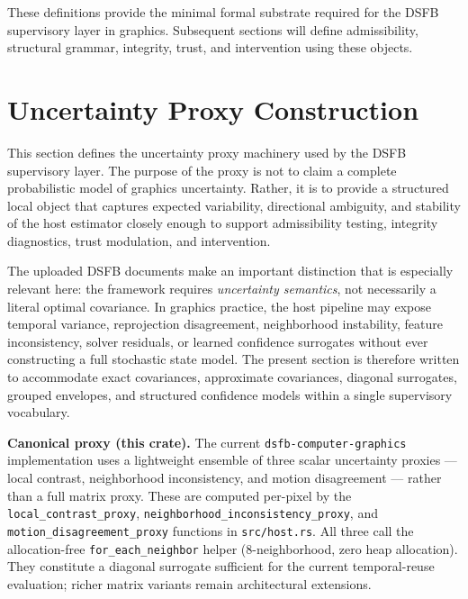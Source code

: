 \documentclass[11pt]{article}
\theoremstyle{definition}
\theoremstyle{plain}
\newenvironment{remarkbox}{%
  \begin{tcolorbox}[colback=blue!4,colframe=black!30,boxrule=0.4pt,%
    left=4pt,right=4pt,top=3pt,bottom=3pt,parbox=false]%
}{%
  \end{tcolorbox}%
}
\begin{document}
These definitions provide the minimal formal substrate required for the DSFB supervisory layer in graphics. Subsequent sections will define admissibility, structural grammar, integrity, trust, and intervention using these objects.


\section{Uncertainty Proxy Construction}
\label{sec:proxy}

This section defines the uncertainty proxy machinery used by the DSFB supervisory layer. The purpose of the proxy is not to claim a complete probabilistic model of graphics uncertainty. Rather, it is to provide a structured local object that captures expected variability, directional ambiguity, and stability of the host estimator closely enough to support admissibility testing, integrity diagnostics, trust modulation, and intervention.

The uploaded DSFB documents make an important distinction that is especially relevant here: the framework requires \emph{uncertainty semantics}, not necessarily a literal optimal covariance. In graphics practice, the host pipeline may expose temporal variance, reprojection disagreement, neighborhood instability, feature inconsistency, solver residuals, or learned confidence surrogates without ever constructing a full stochastic state model. The present section is therefore written to accommodate exact covariances, approximate covariances, diagonal surrogates, grouped envelopes, and structured confidence models within a single supervisory vocabulary.

\begin{remarkbox}
\textbf{Canonical proxy (this crate).}
The current \texttt{dsfb-computer-graphics} implementation uses a lightweight ensemble of three scalar uncertainty proxies — local contrast, neighborhood inconsistency, and motion disagreement — rather than a full matrix proxy. These are computed per-pixel by the \texttt{local\_contrast\_proxy}, \texttt{neighborhood\_inconsistency\_proxy}, and \texttt{motion\_disagreement\_proxy} functions in \texttt{src/host.rs}. All three call the allocation-free \texttt{for\_each\_neighbor} helper (8-neighborhood, zero heap allocation). They constitute a diagonal surrogate sufficient for the current temporal-reuse evaluation; richer matrix variants remain architectural extensions.
\end{remarkbox}
\end{document}
